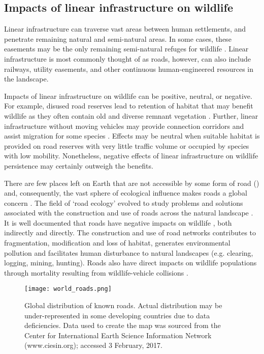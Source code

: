 \subsection{Impacts of linear infrastructure on wildlife}

Linear infrastructure can traverse vast areas between human settlements, and penetrate remaining natural and semi-natural areas. In some cases, these easements may be the only remaining semi-natural refuges for wildlife \citep{benn91}. Linear infrastructure is most commonly thought of as roads, however, can also include railways, utility easements, and other continuous human-engineered resources in the landscape.

Impacts of linear infrastructure on wildlife can be positive, neutral, or negative. For example, disused road reserves lead to retention of habitat that may benefit wildlife as they often contain old and diverse remnant vegetation \citep{lent11}. Further, linear infrastructure without moving vehicles may provide connection corridors and assist migration for some species \citep{rvdr15}. Effects may be neutral when suitable habitat is provided on road reserves with very little traffic volume or occupied by species with low mobility. Nonetheless, negative effects of linear infrastructure on wildlife persistence may certainly outweigh the benefits.

There are few places left on Earth that are not accessible by some form of road () and, consequently, the vast sphere of ecological influence makes roads a global concern \citep{laur14}. The field of `road ecology' evolved to study problems and solutions associated with the construction and use of roads across the natural landscape \citep[see][]{form03}. It is well documented that roads have negative impacts on wildlife \citep{form98,spel98,rvdr15}, both indirectly and directly. The construction and use of road networks contributes to fragmentation, modification and loss of habitat, generates environmental pollution and facilitates human disturbance to natural landscapes (e.g. clearing, logging, mining, hunting). Roads also have direct impacts on wildlife populations through mortality resulting from wildlife-vehicle collisions \citep{fahr09}.

\begin{figure*}[!t]
  \centering
  \texttt{[image: world\_roads.png]}
  \caption[Global distribution of known roads]{Global distribution of known roads. Actual distribution may be under-represented in some developing countries due to data deficiencies. Data used to create the map was sourced from the Center for International Earth Science Information Network (www.ciesin.org); accessed 3 February, 2017.}
  \label{roads}
\end{figure*}

